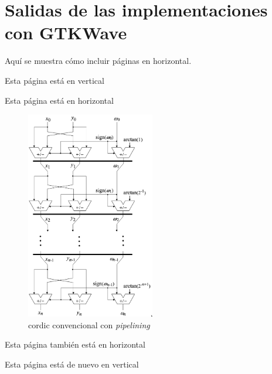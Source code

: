 


\chapter{Salidas de las implementaciones con GTKWave}
Aquí se muestra cómo incluir páginas en horizontal.

Esta página está en vertical\\
\clearpage %

\begin{landscape} %
	

Esta página está en horizontal

\begin{figure}[ht]
	\centering
	\includegraphics[width=0.50\textwidth]{archivos/CORDIC/2009-CORDIC_pipelined.png}
	\caption{\gls{cordic} convencional con \textit{pipelining}}
	\label{graf:2009-CORDIC_pipelined}
\end{figure}


\clearpage %

Esta página también está en horizontal\\

\end{landscape} %
\clearpage %


Esta página está de nuevo en vertical\\